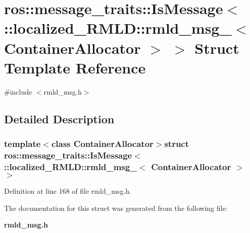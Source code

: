 \section{ros::message\_\-traits::IsMessage$<$ ::localized\_\-RMLD::rmld\_\-msg\_\-$<$ ContainerAllocator $>$ $>$ Struct Template Reference}
\label{structros_1_1message__traits_1_1IsMessage_3_01_1_1localized__RMLD_1_1rmld__msg___3_01ContainerAllocator_01_4_01_4}


{\ttfamily \#include $<$rmld\_\-msg.h$>$}



\subsection{Detailed Description}
\subsubsection*{template$<$class ContainerAllocator$>$struct ros::message\_\-traits::IsMessage$<$ ::localized\_\-RMLD::rmld\_\-msg\_\-$<$ ContainerAllocator $>$ $>$}



Definition at line 168 of file rmld\_\-msg.h.



The documentation for this struct was generated from the following file:\begin{DoxyCompactItemize}
\item 
{\bf rmld\_\-msg.h}\end{DoxyCompactItemize}
